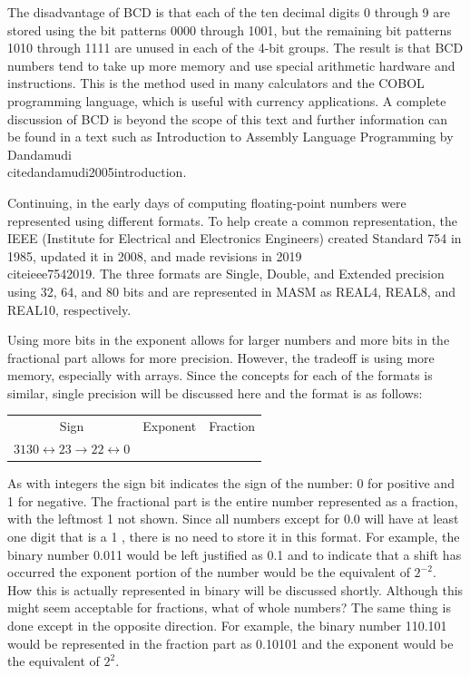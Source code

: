 \documentclass[10pt]{book}
\begin{document}
The disadvantage of BCD is that each of the ten decimal digits 0 through 9 are stored using the bit patterns 0000 through 1001, but the remaining bit patterns 1010 through 1111 are unused in each of the 4-bit groups. The result is that BCD numbers tend to take up more memory and use special arithmetic hardware and instructions. This is the method used in many calculators and the COBOL programming language, which is useful with currency applications. A complete discussion of BCD is beyond the scope of this text and further information can be found in a text such as Introduction to Assembly Language Programming by Dandamudi \\cite{dandamudi2005introduction}.

Continuing, in the early days of computing floating-point numbers were represented using different formats. To help create a common representation, the IEEE (Institute for Electrical and Electronics Engineers) created Standard 754 in 1985, updated it in 2008, and made revisions in 2019 \\cite{ieee7542019}. The three formats are Single, Double, and Extended precision using 32, 64, and 80 bits and are represented in MASM as REAL4, REAL8, and REAL10, respectively.

Using more bits in the exponent allows for larger numbers and more bits in the fractional part allows for more precision. However, the tradeoff is using more memory, especially with arrays. Since the concepts for each of the formats is similar, single precision will be discussed here and the format is as follows:

\begin{center}
\begin{tabular}{c|c|c|}
\hline
Sign & Exponent & Fraction \\
$3130 \longleftrightarrow 23 \longrightarrow 22 \longleftrightarrow 0$ &  &  \\
\end{tabular}
\end{center}

As with integers the sign bit indicates the sign of the number: 0 for positive and 1 for negative. The fractional part is the entire number represented as a fraction, with the leftmost 1 not shown. Since all numbers except for 0.0 will have at least one digit that is a 1 , there is no need to store it in this format. For example, the binary number 0.011 would be left justified as 0.1 and to indicate that a shift has occurred the exponent portion of the number would be the equivalent of $2^{-2}$. How this is actually represented in binary will be discussed shortly. Although this might seem acceptable for fractions, what of whole numbers? The same thing is done except in the opposite direction. For example, the binary number 110.101 would be represented in the fraction part as 0.10101 and the exponent would be the equivalent of $2^{2}$.
\end{document}
